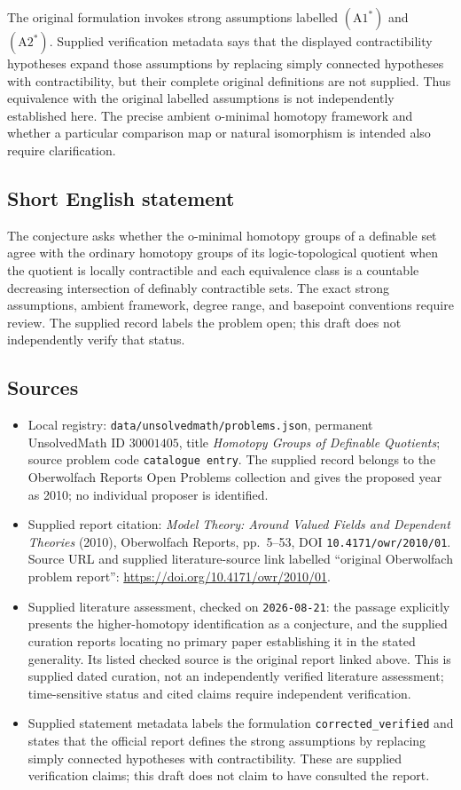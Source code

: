 \documentclass[11pt]{article}
\begin{document}
The original formulation invokes strong assumptions labelled \((\mathrm{A1}^{*})\) and \((\mathrm{A2}^{*})\). Supplied verification metadata says that the displayed contractibility hypotheses expand those assumptions by replacing simply connected hypotheses with contractibility, but their complete original definitions are not supplied. Thus equivalence with the original labelled assumptions is not independently established here. The precise ambient o-minimal homotopy framework and whether a particular comparison map or natural isomorphism is intended also require clarification.
\subsection{Short English statement}
The conjecture asks whether the o-minimal homotopy groups of a definable set agree with the ordinary homotopy groups of its logic-topological quotient when the quotient is locally contractible and each equivalence class is a countable decreasing intersection of definably contractible sets. The exact strong assumptions, ambient framework, degree range, and basepoint conventions require review. The supplied record labels the problem open; this draft does not independently verify that status.
\subsection{Sources}
\begin{itemize}
\item Local registry: \texttt{data/unsolvedmath/problems.json}, permanent UnsolvedMath ID \(30001405\), title \emph{Homotopy Groups of Definable Quotients}; source problem code \texttt{catalogue entry}. The supplied record belongs to the Oberwolfach Reports Open Problems collection and gives the proposed year as 2010; no individual proposer is identified.
\item Supplied report citation: \emph{Model Theory: Around Valued Fields and Dependent Theories} (2010), Oberwolfach Reports, pp.~5--53, DOI \texttt{10.4171/owr/2010/01}. Source URL and supplied literature-source link labelled ``original Oberwolfach problem report'': \url{https://doi.org/10.4171/owr/2010/01}.
\item Supplied literature assessment, checked on \texttt{2026-08-21}: the passage explicitly presents the higher-homotopy identification as a conjecture, and the supplied curation reports locating no primary paper establishing it in the stated generality. Its listed checked source is the original report linked above. This is supplied dated curation, not an independently verified literature assessment; time-sensitive status and cited claims require independent verification.
\item Supplied statement metadata labels the formulation \texttt{corrected\_verified} and states that the official report defines the strong assumptions by replacing simply connected hypotheses with contractibility. These are supplied verification claims; this draft does not claim to have consulted the report.
\end{itemize}
\end{document}
